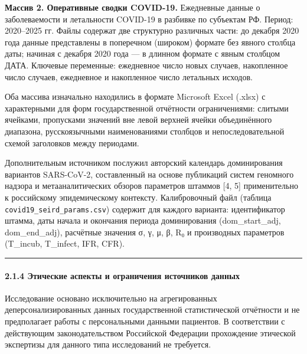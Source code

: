 \documentclass[12pt]{article}
\begin{document}
\textbf{Массив 2. Оперативные сводки COVID-19.} Ежедневные данные о
заболеваемости и летальности COVID-19 в разбивке по субъектам РФ.
Период: 2020--2025 гг. Файлы содержат две структурно различных части: до
декабря 2020 года данные представлены в поперечном (широком) формате без
явного столбца даты; начиная с декабря 2020 года --- в длинном формате с
явным столбцом ДАТА. Ключевые переменные: ежедневное число новых
случаев, накопленное число случаев, ежедневное и накопленное число
летальных исходов.

Оба массива изначально находились в формате Microsoft Excel (.xlsx) с
характерными для форм государственной отчётности ограничениями: слитыми
ячейками, пропусками значений вне левой верхней ячейки объединённого
диапазона, русскоязычными наименованиями столбцов и непоследовательной
схемой заголовков между периодами.

Дополнительным источником послужил авторский календарь доминирования
вариантов SARS-CoV-2, составленный на основе публикаций систем геномного
надзора и метааналитических обзоров параметров штаммов {[}4, 5{]}
применительно к российскому эпидемическому контексту. Калибровочный файл
(таблица \texttt{covid19\_seird\_params.csv}) содержит для каждого
варианта: идентификатор штамма, даты начала и окончания периода
доминирования (dom\_start\_adj, dom\_end\_adj), расчётные значения σ, γ,
μ, β, R₀ и производных параметров (T\_incub, T\_infect, IFR, CFR).

\begin{center}\rule{0.5\linewidth}{0.5pt}\end{center}

\paragraph{2.1.4 Этические аспекты и ограничения источников
данных}\label{ux44dux442ux438ux447ux435ux441ux43aux438ux435-ux430ux441ux43fux435ux43aux442ux44b-ux438-ux43eux433ux440ux430ux43dux438ux447ux435ux43dux438ux44f-ux438ux441ux442ux43eux447ux43dux438ux43aux43eux432-ux434ux430ux43dux43dux44bux445}

Исследование основано исключительно на агрегированных
деперсонализированных данных государственной статистической отчётности и
не предполагает работы с персональными данными пациентов. В соответствии
с действующим законодательством Российской Федерации прохождение
этической экспертизы для данного типа исследований не требуется.
\end{document}
